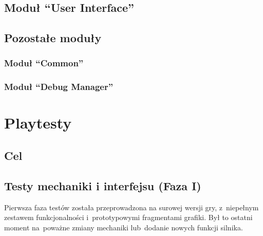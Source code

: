 \documentclass[licencjacka]{pracamgr}
\begin{document}
  \section{Moduł ``User Interface''}
  
  \section{Pozostałe moduły}
    \subsection{Moduł ``Common''}
    
    \subsection{Moduł ``Debug Manager''}

\chapter{Playtesty}
  \section{Cel}
    
    \section{Testy mechaniki i interfejsu (Faza I)}
    Pierwsza faza testów została przeprowadzona na surowej wersji gry, 
    z~niepełnym zestawem funkcjonalności i~prototypowymi fragmentami grafiki. 
    Był to ostatni moment na~poważne zmiany mechaniki lub~dodanie nowych funkcji silnika.
      
\end{document}
